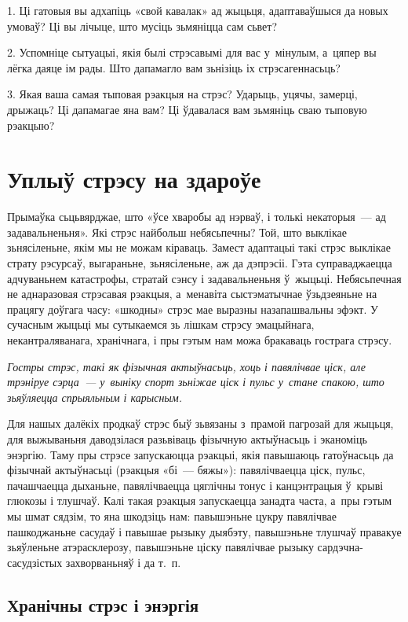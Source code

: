1. Ці гатовыя вы адхапіць «свой кавалак» ад жыцьця, адаптаваўшыся да новых умоваў? Ці вы лічыце, што мусіць зьмяніцца сам сьвет?

2. Успомніце сытуацыі, якія былі стрэсавымі для вас у~мінулым, а~цяпер вы лёгка даяце ім рады. Што дапамагло вам зьнізіць іх стрэсагеннасьць?

3. Якая ваша самая тыповая рэакцыя на стрэс? Ударыць, уцячы, замерці, дрыжаць? Ці дапамагае яна вам? Ці ўдавалася вам зьмяніць сваю тыповую рэакцыю?


\section{Уплыў стрэсу на здароўе}

Прымаўка сьцьвярджае, што «ўсе хваробы ад нэрваў, і толькі некаторыя~--- ад задавальненьня». Які стрэс найбольш небясьпечны? Той, што выклікае зьнясіленьне, якім мы не можам кіраваць. Замест адаптацыі такі стрэс выклікае страту рэсурсаў, выгараньне, зьнясіленьне, аж да дэпрэсіі. Гэта суправаджаецца адчуваньнем катастрофы, стратай сэнсу і задавальненьня ў~жыцьці. Небясьпечная не аднаразовая стрэсавая рэакцыя, а~менавіта сыстэматычнае ўзьдзеяньне на працягу доўгага часу: «шкодны» стрэс мае выразны назапашвальны эфэкт. У сучасным жыцьці мы сутыкаемся зь лішкам стрэсу эмацыйнага, некантраляванага, хранічнага, і пры гэтым нам можа бракаваць гострага стрэсу.

\emph{Гостры стрэс, такі як фізычная актыўнасьць, хоць і павялічвае ціск, але трэніруе сэрца~--- у~выніку спорт зьніжае ціск і пульс у~стане спакою, што зьяўляецца спрыяльным і карысным.}

Для нашых далёкіх продкаў стрэс быў зьвязаны з~прамой пагрозай для жыцьця, для выжываньня даводзілася разьвіваць фізычную актыўнасьць і эканоміць энэргію. Таму пры стрэсе запускаюцца рэакцыі, якія павышаюць гатоўнасьць да фізычнай актыўнасьці (рэакцыя «бі~--- бяжы»): павялічваецца ціск, пульс, пачашчаецца дыханьне, павялічваецца цяглічны тонус і канцэнтрацыя ў~крыві глюкозы і тлушчаў. Калі такая рэакцыя запускаецца занадта часта, а~пры гэтым мы шмат сядзім, то яна шкодзіць нам: павышэньне цукру павялічвае пашкоджаньне сасудаў і павышае рызыку дыябэту, павышэньне тлушчаў правакуе зьяўленьне атэрасклерозу, павышэньне ціску павялічвае рызыку сардэчна-сасудзістых захворваньняў і да т.~п.

\subsection*{Хранічны стрэс і энэргія}

